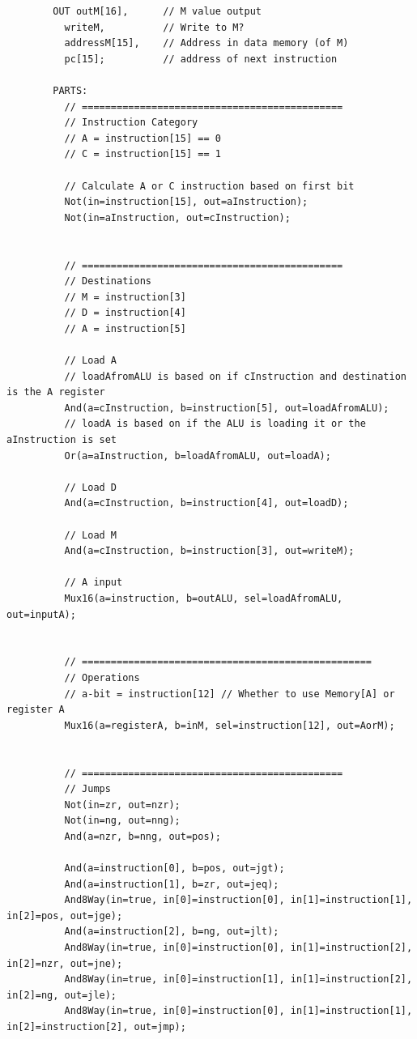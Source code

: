 \documentclass[titlepage]{article}
\begin{document}
\begin{description}
{\begin{lstlisting}
        OUT outM[16],      // M value output
          writeM,          // Write to M?
          addressM[15],    // Address in data memory (of M)
          pc[15];          // address of next instruction

        PARTS:
          // =============================================
          // Instruction Category
          // A = instruction[15] == 0
          // C = instruction[15] == 1

          // Calculate A or C instruction based on first bit
          Not(in=instruction[15], out=aInstruction);
          Not(in=aInstruction, out=cInstruction);


          // =============================================
          // Destinations
          // M = instruction[3]
          // D = instruction[4]
          // A = instruction[5]

          // Load A
          // loadAfromALU is based on if cInstruction and destination is the A register
          And(a=cInstruction, b=instruction[5], out=loadAfromALU);
          // loadA is based on if the ALU is loading it or the aInstruction is set
          Or(a=aInstruction, b=loadAfromALU, out=loadA);

          // Load D
          And(a=cInstruction, b=instruction[4], out=loadD);

          // Load M
          And(a=cInstruction, b=instruction[3], out=writeM);

          // A input
          Mux16(a=instruction, b=outALU, sel=loadAfromALU, out=inputA);


          // ==================================================
          // Operations
          // a-bit = instruction[12] // Whether to use Memory[A] or register A
          Mux16(a=registerA, b=inM, sel=instruction[12], out=AorM);


          // =============================================
          // Jumps
          Not(in=zr, out=nzr);
          Not(in=ng, out=nng);
          And(a=nzr, b=nng, out=pos);

          And(a=instruction[0], b=pos, out=jgt);
          And(a=instruction[1], b=zr, out=jeq);
          And8Way(in=true, in[0]=instruction[0], in[1]=instruction[1], in[2]=pos, out=jge);
          And(a=instruction[2], b=ng, out=jlt);
          And8Way(in=true, in[0]=instruction[0], in[1]=instruction[2], in[2]=nzr, out=jne);
          And8Way(in=true, in[0]=instruction[1], in[1]=instruction[2], in[2]=ng, out=jle);
          And8Way(in=true, in[0]=instruction[0], in[1]=instruction[1], in[2]=instruction[2], out=jmp);


\end{lstlisting}}
\end{description}
\end{document}
